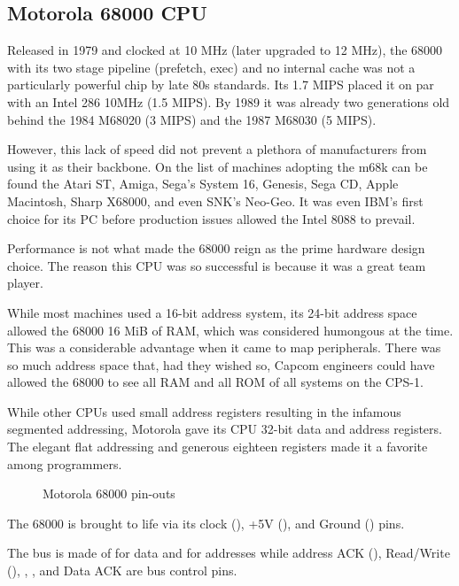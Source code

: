 \subsection{Motorola 68000 CPU}

 Released in 1979 and clocked at 10 MHz (later upgraded to 12 MHz), the 68000 with its two stage pipeline\cite{M68000fv} (prefetch, exec) and no internal cache was not a particularly powerful chip by late 80s standards. Its 1.7 MIPS placed it on par with an Intel 286 10MHz (1.5 MIPS). By 1989 it was already two generations old behind the 1984 M68020 (3 MIPS) and the 1987 M68030 (5 MIPS)\cite{mips}.


However, this lack of speed did not prevent a plethora of manufacturers from using it as their backbone. On the list of machines adopting the m68k can be found the Atari ST, Amiga, Sega's System 16, Genesis, Sega CD, Apple Macintosh, Sharp X68000, and even SNK's Neo-Geo. It was even IBM's first choice for its PC before production issues allowed the Intel 8088 to prevail\cite{ieee20170630}. 

Performance is not what made the 68000 reign as the prime hardware design choice. The reason this CPU was so successful is because it was a great team player.

While most machines used a 16-bit address system, its 24-bit address space allowed the 68000 16 MiB of RAM, which was considered humongous at the time. This was a considerable advantage when it came to map peripherals. There was so much address space that, had they wished so, Capcom engineers could have allowed the 68000 to see all RAM and all ROM of all systems on the CPS-1.

While other CPUs used small address registers resulting in the infamous segmented addressing, Motorola gave its CPU 32-bit data and address registers. The elegant flat addressing and generous eighteen registers made it a favorite among programmers. 


\begin{figure}[H]

 
 \caption*{Motorola 68000 pin-outs}
\label{68000drawing}
  \end{figure}



The 68000 is brought to life via its clock (), +5V (), and Ground () pins.

The bus is made of  for data and \icode{A0-A15]} for addresses while address ACK (), Read/Write (), , , and Data ACK  are bus control pins.


